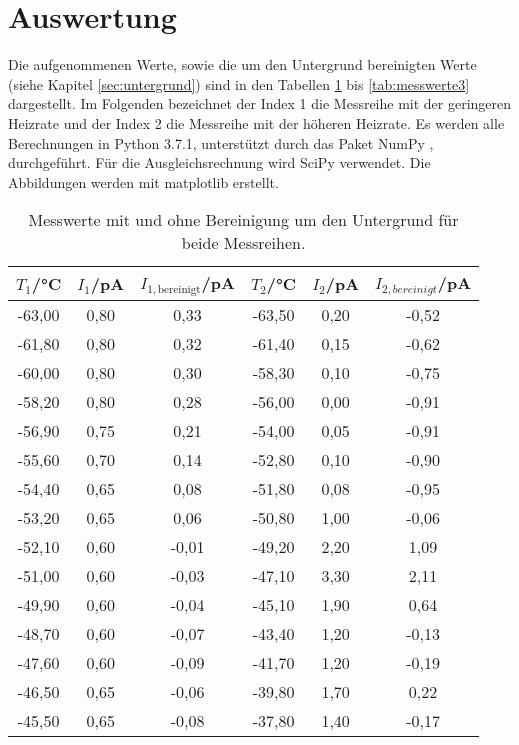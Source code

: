 \section{Auswertung}
\label{sec:Auswertung}

Die aufgenommenen Werte, sowie die um den Untergrund bereinigten Werte (siehe
Kapitel \ref{sec:untergrund}) sind in den Tabellen \ref{tab:messwerte1}
bis \ref{tab:messwerte3} dargestellt. Im Folgenden bezeichnet der Index 1 die
Messreihe mit der geringeren Heizrate und der Index 2 die Messreihe mit der
höheren Heizrate. Es werden alle Berechnungen in Python 3.7.1, unterstützt durch das
Paket NumPy \cite{numpy}, durchgeführt. Für die Ausgleichsrechnung wird SciPy
\cite{scipy} verwendet. Die Abbildungen werden mit matplotlib \cite{matplotlib} erstellt.

\begin{table}[htp]
	\begin{center}
    \caption{Messwerte mit und ohne Bereinigung um den Untergrund für beide Messreihen.}
    \label{tab:messwerte1}
		\begin{tabular}{cccccc}
		\toprule
			{$T_1$/°C} & {$I_1$/pA} & {$I_{1,\text{bereinigt}}$/pA} & {$T_2$/°C} & {$I_2$/pA} & {$I_{2,bereinigt}$/pA}\\
			\midrule
			-63,00 & 0,80 & 0,33 & -63,50 & 0,20 & -0,52\\
			-61,80 & 0,80 & 0,32 & -61,40 & 0,15 & -0,62\\
			-60,00 & 0,80 & 0,30 & -58,30 & 0,10 & -0,75\\
			-58,20 & 0,80 & 0,28 & -56,00 & 0,00 & -0,91\\
			-56,90 & 0,75 & 0,21 & -54,00 & 0,05 & -0,91\\
			-55,60 & 0,70 & 0,14 & -52,80 & 0,10 & -0,90\\
			-54,40 & 0,65 & 0,08 & -51,80 & 0,08 & -0,95\\
			-53,20 & 0,65 & 0,06 & -50,80 & 1,00 & -0,06\\
			-52,10 & 0,60 &-0,01 & -49,20 & 2,20 & 1,09\\
			-51,00 & 0,60 &-0,03 & -47,10 & 3,30 & 2,11\\
			-49,90 & 0,60 &-0,04 & -45,10 & 1,90 & 0,64\\
			-48,70 & 0,60 &-0,07 & -43,40 & 1,20 & -0,13\\
			-47,60 & 0,60 &-0,09 & -41,70 & 1,20 & -0,19\\
			-46,50 & 0,65 &-0,06 & -39,80 & 1,70 & 0,22\\
			-45,50 & 0,65 &-0,08 & -37,80 & 1,40 & -0,17\\

\end{tabular}
\end{center}
\end{table}
